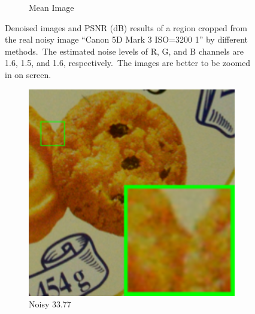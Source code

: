 \begin{figure}
\begin{subfigure}[t]{0.19\textwidth}
		\caption{Mean Image}
    \end{subfigure}
    \caption{Denoised images and PSNR (dB) results of a region cropped from the real noisy image ``Canon 5D Mark 3 ISO=3200 1'' \cite{crosschannel2016} by different methods.\ The estimated noise levels of R, G, and B channels are 1.6, 1.5, and 1.6, respectively.\ The images are better to be zoomed in on screen.}
    \label{fig4-14}
\end{figure}



\begin{figure}
    \centering
    \begin{subfigure}[t]{0.19\textwidth}
        \centering
        \includegraphics[width=1\textwidth]{images/mcwnnm/cc/resize_br_Noisy_d600_iso3200_2.png}
		\caption{Noisy 33.77}
    \end{subfigure}
    \hfill
    \begin{subfigure}[t]{0.19\textwidth}
        \centering

\end{subfigure}
\end{figure}
